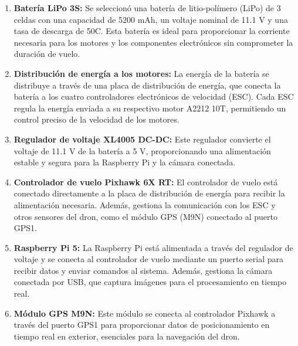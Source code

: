     \begin{enumerate}
        \item \textbf{Batería LiPo 3S:} 
        Se seleccionó una batería de litio-polímero (LiPo) de 3 celdas con una capacidad de 5200 mAh, un voltaje nominal de 11.1 V y una tasa de descarga de 50C. Esta batería es ideal para proporcionar la corriente necesaria para los motores y los componentes electrónicos sin comprometer la duración de vuelo.
    
        \item \textbf{Distribución de energía a los motores:} 
        La energía de la batería se distribuye a través de una placa de distribución de energía, que conecta la batería a los cuatro controladores electrónicos de velocidad (ESC). Cada ESC regula la energía enviada a su respectivo motor A2212 10T, permitiendo un control preciso de la velocidad de los motores.
    
        \item \textbf{Regulador de voltaje XL4005 DC-DC:} 
        Este regulador convierte el voltaje de 11.1 V de la batería a 5 V, proporcionando una alimentación estable y segura para la Raspberry Pi y la cámara conectada.
    
        \item \textbf{Controlador de vuelo Pixhawk 6X RT:} 
        El controlador de vuelo está conectado directamente a la placa de distribución de energía para recibir la alimentación necesaria. Además, gestiona la comunicación con los ESC y otros sensores del dron, como el módulo GPS (M9N) conectado al puerto GPS1.
    
        \item \textbf{Raspberry Pi 5:} 
        La Raspberry Pi está alimentada a través del regulador de voltaje y se conecta al controlador de vuelo mediante un puerto serial para recibir datos y enviar comandos al sistema. Además, gestiona la cámara conectada por USB, que captura imágenes para el procesamiento en tiempo real.
    
        \item \textbf{Módulo GPS M9N:} 
        Este módulo se conecta al controlador Pixhawk a través del puerto GPS1 para proporcionar datos de posicionamiento en tiempo real en exterior, esenciales para la navegación del dron.
    
    \end{enumerate}
    
